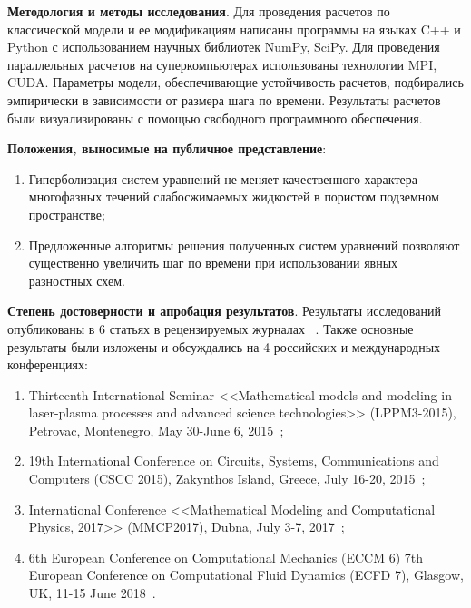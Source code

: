 \textbf{Методология и методы исследования}. Для проведения расчетов по классической модели и ее модификациям написаны программы на языках C++ и Python с использованием научных библиотек NumPy, SciPy. Для проведения параллельных расчетов на суперкомпьютерах использованы технологии MPI, CUDA.
Параметры модели, обеспечивающие устойчивость расчетов, подбирались эмпирически в зависимости от размера шага по времени.
Результаты расчетов были визуализированы с помощью свободного программного обеспечения.

\textbf{Положения, выносимые на публичное представление}:
\begin{enumerate}
 \item Гиперболизация систем уравнений не меняет качественного характера многофазных течений слабосжимаемых жидкостей в пористом подземном
пространстве;
 \item Предложенные алгоритмы решения полученных систем уравнений позволяют существенно увеличить шаг по времени при использовании явных разностных схем.
\end{enumerate}

\textbf{Степень достоверности и апробация результатов}. Результаты исследований опубликованы в 6 статьях в рецензируемых журналах
~\citeauthor{matmod2014, matmod2015, preprint12016, preprint22016, preprint12018, preprint22018}. Также основные результаты были изложены и обсуждались на 4 российских и международных конференциях:
\begin{enumerate}
 \item Thirteenth International Seminar <<Mathematical models and modeling in laser-plasma processes and advanced science technologies>> (LPPM3-2015), Petrovac, Montenegro, May 30-June 6, 2015~\citeauthor{proc13th};
 \item 19th International Conference on Circuits, Systems, Communications and Computers (CSCC 2015), Zakynthos Island, Greece, July 16-20, 2015~\citeauthor{proc19th};
 \item International Conference <<Mathematical Modeling and Computational Physics, 2017>> (MMCP2017), Dubna, July 3-7, 2017~\citeauthor{proc2017};
 \item 6th European Conference on Computational Mechanics (ECCM 6) 7th European Conference on Computational Fluid Dynamics (ECFD 7), Glasgow, UK, 11-15 June 2018~\citeauthor{proc2018}.
\end{enumerate}
 
